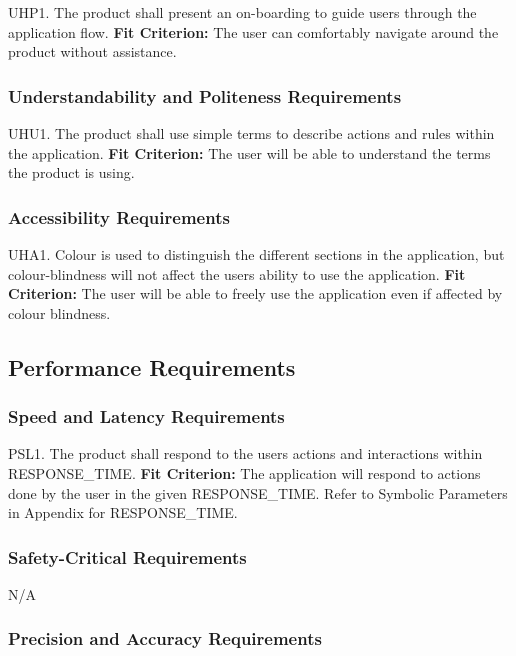 \documentclass[12pt, titlepage]{article}
\begin{document}
UHP1. The product shall present an on-boarding to guide users through the application flow.
  \textbf{Fit Criterion:} The user can comfortably navigate around the product without assistance. 

\subsubsection{Understandability and Politeness Requirements}

UHU1. The product shall use simple terms to describe actions and rules within the application.
	\textbf{Fit Criterion:} The user will be able to understand the terms the product is using.

\subsubsection{Accessibility Requirements}

UHA1. Colour is used to distinguish the different sections in the application, but colour-blindness will not affect the users ability to use the application.
	\textbf{Fit Criterion:} The user will be able to freely use the application even if affected by 
colour blindness.

\subsection{Performance Requirements}

\subsubsection{Speed and Latency Requirements}

PSL1. The product shall respond to the users actions and interactions within RESPONSE\_TIME.
	\textbf{Fit Criterion:} The application will respond to actions done by the user in the given 
RESPONSE\_TIME. Refer to Symbolic Parameters in Appendix for RESPONSE\_TIME.

\subsubsection{Safety-Critical Requirements}

N/A

\subsubsection{Precision and Accuracy Requirements}
\end{document}
